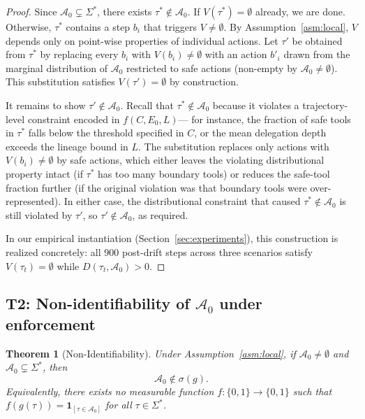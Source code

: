 \documentclass[11pt]{article}
\newtheorem{theorem}{Theorem}[section]
\newcommand{\Sigstar}{\Sigma^{*}}
\newcommand{\Azero}{\mathcal{A}_0}
\newcommand{\sigg}{\sigma(g)}
\newcommand{\Ind}[1]{\mathbf{1}_{[#1]}}
\begin{document}
\begin{proof}
Since $\Azero \subsetneq \Sigstar$, there exists $\tau^* \notin \Azero$.
If $V(\tau^*) = \emptyset$ already, we are done.  Otherwise, $\tau^*$ contains
a step $b_i$ that triggers $V \neq \emptyset$.  By Assumption~\ref{asm:local},
$V$ depends only on point-wise properties of individual actions.  Let $\tau'$
be obtained from $\tau^*$ by replacing every $b_i$ with $V(b_i)\neq\emptyset$
with an action $b'_i$ drawn from the marginal distribution of $\Azero$
restricted to safe actions (non-empty by $\Azero \neq \emptyset$).  This
substitution satisfies $V(\tau') = \emptyset$ by construction.

It remains to show $\tau' \notin \Azero$.  Recall that $\tau^* \notin \Azero$
because it violates a trajectory-level constraint encoded in $f(C, E_0, L)$---
for instance, the fraction of safe tools in $\tau^*$ falls below the threshold
specified in $C$, or the mean delegation depth exceeds the lineage bound in $L$.
The substitution replaces only actions with $V(b_i) \neq \emptyset$ by safe
actions, which either leaves the violating distributional property intact
(if $\tau^*$ has too many boundary tools) or reduces the safe-tool fraction
further (if the original violation was that boundary tools were over-represented).
In either case, the distributional constraint that caused $\tau^* \notin \Azero$
is still violated by $\tau'$, so $\tau' \notin \Azero$, as required.

In our empirical instantiation (Section~\ref{sec:experiments}), this
construction is realized concretely: all 900 post-drift steps across three
scenarios satisfy $V(\tau_t) = \emptyset$ while $D(\tau_t, \Azero) > 0$.
\end{proof}

\subsection{T2: Non-identifiability of $\Azero$ under enforcement}

\begin{theorem}[Non-Identifiability]
\label{thm:nonid}
Under Assumption~\ref{asm:local}, if $\Azero \neq \emptyset$ and
$\Azero \subsetneq \Sigstar$, then
\[
  \Azero \notin \sigg.
\]
Equivalently, there exists no measurable function
$f : \{0,1\} \to \{0,1\}$ such that
$f(g(\tau)) = \Ind{\tau \in \Azero}$ for all $\tau \in \Sigstar$.
\end{theorem}
\end{document}
